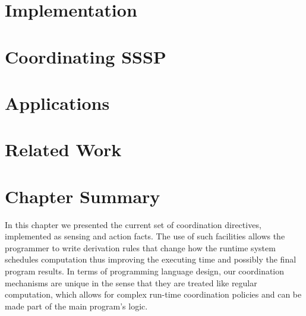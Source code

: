 \section{Implementation}


\section{Coordinating SSSP}


\section{Applications}



\section{Related Work}

\section{Chapter Summary}

In this chapter we presented the current set of coordination directives,
implemented as sensing and action facts. The use of such facilities allows the
programmer to write derivation rules that change how the runtime system
schedules computation thus improving the executing time and possibly the final
program results. In terms of programming language design, our coordination
mechanisms are unique in the sense that they are treated like regular
computation, which allows for complex run-time coordination policies and can be
made part of the main program's logic.
